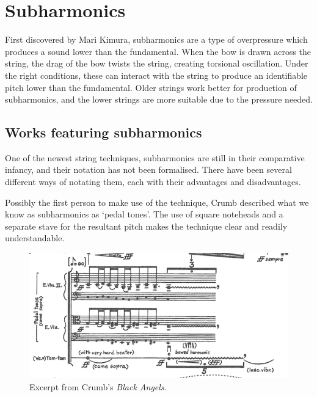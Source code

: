\section{Subharmonics}
First discovered by Mari Kimura, subharmonics are a type of overpressure which produces a sound lower than the fundamental.\autocite{kimuraHowProduceSubharmonics1999}  When the bow is drawn across the string, the drag of the bow twists the string, creating torsional oscillation. Under the right conditions, these can interact with the string to produce an identifiable pitch lower than the fundamental.\autocite{Subharmonics2006} Older strings work better for production of subharmonics, and the lower strings are more suitable due to the pressure needed.\autocite{kimuraHowProduceSubharmonics1999}


\subsection{Works featuring subharmonics}
One of the newest string techniques, subharmonics are still in their comparative infancy, and their notation has not been formalised. There have been several different ways of notating them, each with their advantages and disadvantages.



Possibly the first person to make use of the technique, Crumb described what we know as subharmonics as `pedal tones'.\autocite{crumbBlackAngelsImages1971} The use of square noteheads and a separate stave for the resultant pitch makes the technique clear and readily understandable.
\begin{figure}
    \includegraphics[width=\linewidth]{./resources/crumbBlackAngels.png}
    \caption{Excerpt from Crumb's \emph{Black Angels}.}
\label{fig:Excerpt from Crumb's Black Angels}
  \end{figure}

